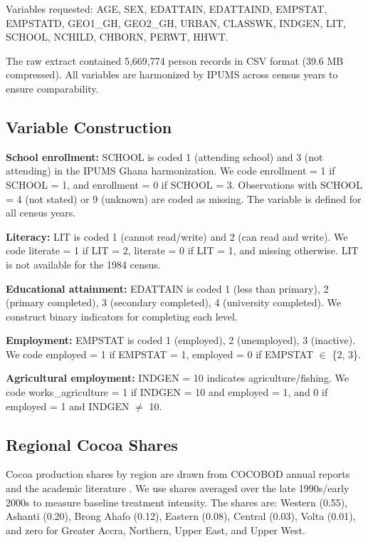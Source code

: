 \documentclass[12pt]{article}
\begin{document}
Variables requested: AGE, SEX, EDATTAIN, EDATTAIND, EMPSTAT, EMPSTATD, GEO1\_GH, GEO2\_GH, URBAN, CLASSWK, INDGEN, LIT, SCHOOL, NCHILD, CHBORN, PERWT, HHWT.

The raw extract contained 5,669,774 person records in CSV format (39.6 MB compressed). All variables are harmonized by IPUMS across census years to ensure comparability.

\subsection{Variable Construction}

\textbf{School enrollment:} SCHOOL is coded 1 (attending school) and 3 (not attending) in the IPUMS Ghana harmonization. We code enrollment = 1 if SCHOOL = 1, and enrollment = 0 if SCHOOL = 3. Observations with SCHOOL = 4 (not stated) or 9 (unknown) are coded as missing. The variable is defined for all census years.

\textbf{Literacy:} LIT is coded 1 (cannot read/write) and 2 (can read and write). We code literate = 1 if LIT = 2, literate = 0 if LIT = 1, and missing otherwise. LIT is not available for the 1984 census.

\textbf{Educational attainment:} EDATTAIN is coded 1 (less than primary), 2 (primary completed), 3 (secondary completed), 4 (university completed). We construct binary indicators for completing each level.

\textbf{Employment:} EMPSTAT is coded 1 (employed), 2 (unemployed), 3 (inactive). We code employed = 1 if EMPSTAT = 1, employed = 0 if EMPSTAT $\in$ \{2, 3\}.

\textbf{Agricultural employment:} INDGEN = 10 indicates agriculture/fishing. We code works\_agriculture = 1 if INDGEN = 10 and employed = 1, and 0 if employed = 1 and INDGEN $\neq$ 10.

\subsection{Regional Cocoa Shares}

Cocoa production shares by region are drawn from COCOBOD annual reports and the academic literature \citep{vigneri2005, kolavalli2011, asamoah2017}. We use shares averaged over the late 1990s/early 2000s to measure baseline treatment intensity. The shares are: Western (0.55), Ashanti (0.20), Brong Ahafo (0.12), Eastern (0.08), Central (0.03), Volta (0.01), and zero for Greater Accra, Northern, Upper East, and Upper West.
\end{document}
